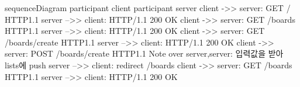 sequenceDiagram
participant client
participant server
client ->> server: GET / HTTP1.1
server -->> client: HTTP/1.1 200 OK
client ->> server: GET /boards HTTP1.1
server -->> client: HTTP/1.1 200 OK
client ->> server: GET /boards/create HTTP1.1
server -->> client: HTTP/1.1 200 OK
client ->> server: POST /boards/create HTTP1.1
Note over server,server: 입력값을 받아 lists에 push
server -->> client: redirect /boards
client ->> server: GET /boards HTTP1.1
server -->> client: HTTP/1.1 200 OK